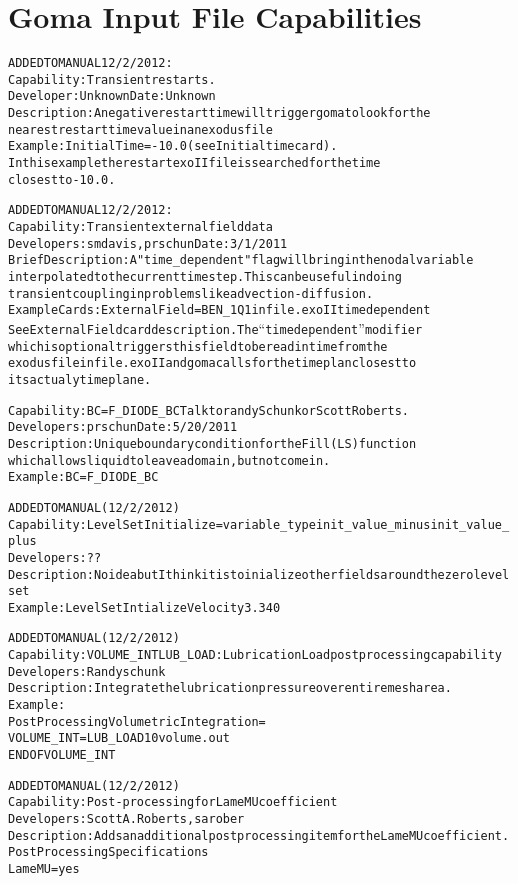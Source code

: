 \documentclass{article}
\begin{document}
\section{Goma Input File Capabilities}
\begin{alltt}


ADDED TO MANUAL 12/2/2012:
Capability: Transient restarts.  
Developer: Unknown  Date: Unknown
Description: A negative restart time will trigger goma to look for the
  nearest restart time value in an exodus file
Example:    Initial Time = -10.0  (see Initial time card).   
  In this example the restart exoII file is searched for the time
  closest to -10.0. 

ADDED TO MANUAL 12/2/2012:
Capability: Transient external field data
Developers: smdavis, prschun  Date: 3/1/2011
Brief Description: A "time_dependent" flag will bring in the nodal variable  
  interpolated to the current time step.   This can be useful in doing 
  transient coupling in problems like advection-diffusion. 
Example Cards: External Field = BEN_1 Q1 infile.exoII timedependent  
  See External Field card description.  The ``timedependent'' modifier
  which is optional triggers this field to be read in time from the
  exodus file infile.exoII and goma calls for the time plan closest to
  its actualy time plane.  

Capability: BC = F_DIODE_BC    Talk to randy Schunk or Scott Roberts. 
Developers: prschun   Date: 5/20/2011
Description: Unique boundary condition for the Fill (LS) function
  which allows liquid to leave a domain, but not come in.  
Example: BC = F_DIODE_BC

ADDED TO MANUAL (12/2/2012)
Capability: Level Set Initialize = variable_type init_value_minus init_value_plus
Developers: ??
Description: No idea but I think it is to inialize other fields around the zero level set
Example: Level Set Intialize Velocity 3.34 0  

ADDED TO MANUAL (12/2/2012)
Capability: VOLUME_INT LUB_LOAD: Lubrication Load post processing capability 
Developers: Randy schunk
Description:  Integrate the lubrication pressure over entire mesh area.  
Example: 
Post Processing Volumetric Integration =
VOLUME_INT = LUB_LOAD 1 0 volume.out
END OF VOLUME_INT

ADDED TO MANUAL (12/2/2012)
Capability:  Post-processing for Lame MU coefficient
Developers:  Scott A. Roberts, sarober
Description:  Adds an additional post processing item for the Lame MU coefficient.
Post Processing Specifications
Lame MU = yes


\end{alltt}
\end{document}
